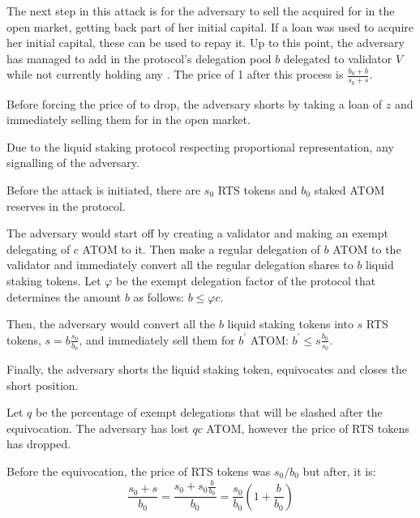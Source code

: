 The next step in this attack is for the adversary to sell the
acquired \stasset for \asset in the open market, getting back part of
her initial capital. If a loan was used to acquire her initial capital,
these \asset can be used to repay it. Up to this point, the adversary
has managed to add in the protocol's delegation pool $b$
\asset delegated to validator $V$ while not currently holding
any \stasset. The price of 1 \stasset after this process
is $\frac{b_0 + b}{s_0 + s}$.

Before forcing the price of \stasset to drop, the adversary shorts
\stasset by taking a loan of $z$ \stasset and immediately selling
them for \asset in the open market.


Due to the liquid staking protocol respecting proportional
representation, any signalling of the adversary.

Before the attack is initiated, there are $s_0$ RTS tokens and $b_0$
staked ATOM reserves in the protocol.

The adversary would start off by creating a validator and making an
exempt delegating of $c$ ATOM to it.
Then make a regular delegation of $b$ ATOM to the validator and
immediately convert all the regular delegation shares to $b$ liquid
staking tokens.
Let $\varphi$ be the exempt delegation factor of the protocol
that determines the amount $b$ as follows: $b \leq \varphi c$.

Then, the adversary would convert all the $b$ liquid staking tokens into
$s$ RTS tokens, $s = b \frac{s_0}{b_0}$, and immediately sell them for
$b^{'}$ ATOM: $b^{'} \leq s \frac{b_0}{s_0}$.

Finally, the adversary shorts the liquid staking token, equivocates
and closes the short position.

Let $q$ be the percentage of exempt delegations that will be slashed after
the equivocation. The adversary has lost $qc$ ATOM, however the price of RTS
tokens has dropped.

Before the equivocation, the price of RTS tokens was $s_0/b_0$ but
after, it is:
\[
\frac{s_0 + s}{b_0} =
\frac{s_0 + s_0\frac{b}{b_0}}{b_0} =
\frac{s_0}{b_0} (1 + \frac{b}{b_0})
\]

